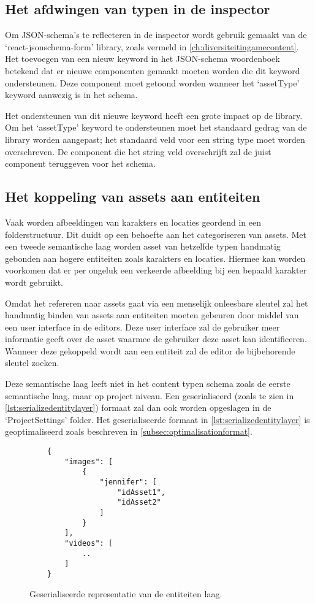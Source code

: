 \subsection{Het afdwingen van typen in de inspector}
Om JSON-schema’s te reflecteren in de inspector wordt gebruik gemaakt van de ‘react-jsonschema-form’ library, zoals vermeld in \autoref{ch:diversiteitingamecontent}. Het toevoegen van een nieuw keyword in het JSON-schema woordenboek betekend dat er nieuwe componenten gemaakt moeten worden die dit keyword ondersteunen. Deze component moet getoond worden wanneer het ‘assetType’ keyword aanwezig is in het schema.

Het ondersteunen van dit nieuwe keyword heeft een grote impact op de library. Om het ‘assetType’ keyword te ondersteunen moet het standaard gedrag van de library worden aangepast; het standaard veld voor een string type moet worden overschreven. De component die het string veld overschrijft zal de juist component teruggeven voor het schema.

\subsection{Het koppeling van assets aan entiteiten}
Vaak worden afbeeldingen van karakters en locaties geordend in een folderstructuur. Dit duidt op een behoefte aan het categoriseren van assets. Met een tweede semantische laag worden asset van hetzelfde typen handmatig gebonden aan hogere entiteiten zoals karakters en locaties. Hiermee kan worden voorkomen dat er per ongeluk een verkeerde afbeelding bij een bepaald karakter wordt gebruikt.

Omdat het refereren naar assets gaat via een menselijk onleesbare sleutel zal het handmatig binden van assets aan entiteiten moeten gebeuren door middel van een user interface in de editors. Deze user interface zal de gebruiker meer informatie geeft over de asset waarmee de gebruiker deze asset kan identificeren. Wanneer deze gekoppeld wordt aan een entiteit zal de editor de bijbehorende sleutel zoeken.

Deze semantische laag leeft niet in het content typen schema zoals de eerste semantische laag, maar op project niveau. Een geserialiseerd (zoals te zien in \autoref{lst:serializedentitylayer}) formaat zal dan ook worden opgeslagen in de ‘ProjectSettings’ folder. Het geserialiseerde formaat in \autoref{lst:serializedentitylayer} is geoptimaliseerd zoals beschreven in \autoref{subsec:optimalisationformat}.

\begin{figure}[htb]
    \centering
    \lstset{language=JavaScript}
    \begin{lstlisting}
    {
        "images": [
            {
                "jennifer": [
                    "idAsset1",
                    "idAsset2"
                ]
            }
        ],
        "videos": [
            ..
        ]
    }          
    \end{lstlisting}
    \caption{Geserialiseerde representatie van de entiteiten laag.}
    \label{lst:serializedentitylayer}
\end{figure}

